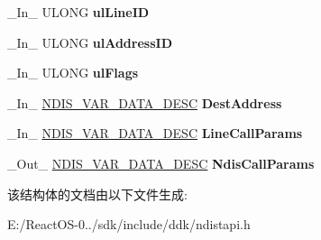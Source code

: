 \begin{DoxyCompactItemize}
\item 
\mbox{\label{struct___c_o___t_a_p_i___t_r_a_n_s_l_a_t_e___t_a_p_i___c_a_l_l_p_a_r_a_m_s_a19fc7b831d3b664efa33b9885375c980}} 
\+\_\+\+In\+\_\+ U\+L\+O\+NG {\bfseries ul\+Line\+ID}
\item 
\mbox{\label{struct___c_o___t_a_p_i___t_r_a_n_s_l_a_t_e___t_a_p_i___c_a_l_l_p_a_r_a_m_s_a5eb7c91e99ebf6c3169debef58f41d9d}} 
\+\_\+\+In\+\_\+ U\+L\+O\+NG {\bfseries ul\+Address\+ID}
\item 
\mbox{\label{struct___c_o___t_a_p_i___t_r_a_n_s_l_a_t_e___t_a_p_i___c_a_l_l_p_a_r_a_m_s_acce7576666568c065b350e10388fc463}} 
\+\_\+\+In\+\_\+ U\+L\+O\+NG {\bfseries ul\+Flags}
\item 
\mbox{\label{struct___c_o___t_a_p_i___t_r_a_n_s_l_a_t_e___t_a_p_i___c_a_l_l_p_a_r_a_m_s_a826465e55d42207660ed70e4c4d467c2}} 
\+\_\+\+In\+\_\+ \hyperlink{struct___n_d_i_s___v_a_r___d_a_t_a___d_e_s_c}{N\+D\+I\+S\+\_\+\+V\+A\+R\+\_\+\+D\+A\+T\+A\+\_\+\+D\+E\+SC} {\bfseries Dest\+Address}
\item 
\mbox{\label{struct___c_o___t_a_p_i___t_r_a_n_s_l_a_t_e___t_a_p_i___c_a_l_l_p_a_r_a_m_s_a4c1e8c1772068cb48a40b51ac44f80d6}} 
\+\_\+\+In\+\_\+ \hyperlink{struct___n_d_i_s___v_a_r___d_a_t_a___d_e_s_c}{N\+D\+I\+S\+\_\+\+V\+A\+R\+\_\+\+D\+A\+T\+A\+\_\+\+D\+E\+SC} {\bfseries Line\+Call\+Params}
\item 
\mbox{\label{struct___c_o___t_a_p_i___t_r_a_n_s_l_a_t_e___t_a_p_i___c_a_l_l_p_a_r_a_m_s_a8bccc95d73cead7bebdcd5f2cb04443f}} 
\+\_\+\+Out\+\_\+ \hyperlink{struct___n_d_i_s___v_a_r___d_a_t_a___d_e_s_c}{N\+D\+I\+S\+\_\+\+V\+A\+R\+\_\+\+D\+A\+T\+A\+\_\+\+D\+E\+SC} {\bfseries Ndis\+Call\+Params}
\end{DoxyCompactItemize}


该结构体的文档由以下文件生成\+:\begin{DoxyCompactItemize}
\item 
E\+:/\+React\+O\+S-\/0../sdk/include/ddk/ndistapi.\+h\end{DoxyCompactItemize}
